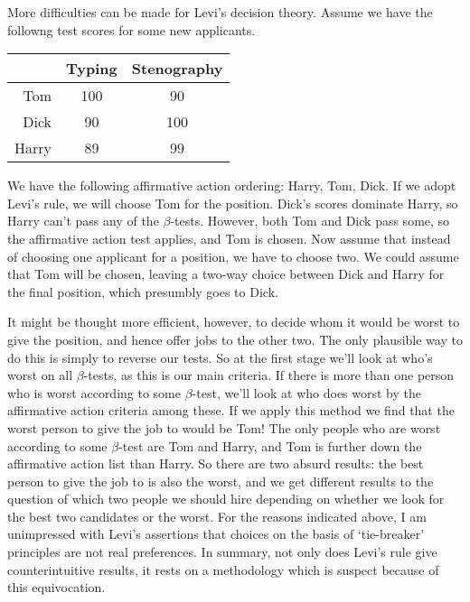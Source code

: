 More difficulties can be made for Levi's decision theory. Assume we have
the followng test scores for some new applicants.

\begin{table}[htbp]
\begin{minipage}{\linewidth}
\setlength{\tymax}{0.5\linewidth}
\centering
\small
\begin{tabulary}{\textwidth}{@{}rcc@{}} \toprule
 & Typing & Stenography\\
\midrule

 Tom & 100 & 90 \\
 Dick & 90 & 100 \\
 Harry & 89 & 99 \\
\bottomrule

\end{tabulary}
\end{minipage}
\end{table}

We have the following affirmative action ordering: Harry, Tom, Dick. If
we adopt Levi's rule, we will choose Tom for the position. Dick's scores
dominate Harry, so Harry can't pass any of the $\beta$-tests. However, both
Tom and Dick pass some, so the affirmative action test applies, and Tom
is chosen. Now assume that instead of choosing one applicant for a
position, we have to choose two. We could assume that Tom will be
chosen, leaving a two-way choice between Dick and Harry for the final
position, which presumbly goes to Dick.

It might be thought more efficient, however, to decide whom it would be
worst to give the position, and hence offer jobs to the other two. The
only plausible way to do this is simply to reverse our tests. So at the
first stage we'll look at who's worst on all $\beta$-tests, as this is our
main criteria. If there is more than one person who is worst according
to some $\beta$-test, we'll look at who does worst by the affirmative action
criteria among these. If we apply this method we find that the worst
person to give the job to would be Tom! The only people who are worst
according to some $\beta$-test are Tom and Harry, and Tom is further down the
affirmative action list than Harry. So there are two absurd results: the
best person to give the job to is also the worst, and we get different
results to the question of which two people we should hire depending on
whether we look for the best two candidates or the worst. For the
reasons indicated above, I am unimpressed with Levi's assertions that
choices on the basis of `tie-breaker' principles are not real
preferences. In summary, not only does Levi's rule give counterintuitive
results, it rests on a methodology which is suspect because of this
equivocation.

